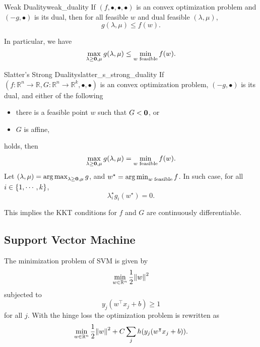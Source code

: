 \documentclass{article}
\begin{document}
\begin{proposition}{Weak Duality}{weak_duality}
    If $(f,\bullet,\bullet,\bullet)$ is an convex optimization problem and $(-g,\bullet)$ is its dual, then for all feasible $w$ and dual feasible $(\lambda,\mu)$,
    \[ g(\lambda,\mu) \le f(w). \]
\end{proposition}
In particular, we have
\[ \max_{\lambda\ge \vb{0},\mu} g(\lambda,\mu) \le \min_{w \text{ feasible}} f(w). \]

\begin{theorem}{Slatter's Strong Duality}{slatter_s_strong_duality}
    If $(f:\mathbb{R}^n\rightarrow \mathbb{R},G: \mathbb{R}^n\rightarrow \mathbb{R}^k,\bullet,\bullet)$ is an convex optimization problem, $(-g,\bullet)$ is its dual, and either of the following
    \begin{itemize}
        \item there is a feasible point $w$ such that $G < \vb{0}$, or
        \item $G$ is affine,
    \end{itemize}
    holds, then
    \[ \max_{\lambda\ge \vb{0},\mu} g(\lambda,\mu) = \min_{w \text{ feasible}} f(w). \]
    Let $(\lambda,\mu) = \operatorname*{arg\,max}_{\lambda\ge \vb{0},\mu} g$, and $w^\star = \operatorname*{arg\,min}_{w \text{ feasible}} f$.
    In such case, for all $i\in\qty{1,\cdots,k}$,
    \[ \lambda_i^\star g_i(w^\star) = 0. \]
\end{theorem}

This implies the KKT conditions for $f$ and $G$ are continuously differentiable.

\subsection{Support Vector Machine}

The minimization problem of SVM is given by
\[ \min_{w\in\mathbb{R}^n} \frac{1}{2}\norm{w}^2 \]
subjected to
\[ y_j ( w^\intercal x_j + b) \ge 1 \]
for all $j$.
With the hinge loss the optimization problem is rewritten as
\[ \min_{w\in\mathbb{R}^n} \frac{1}{2}\norm{w}^2 + C \sum_j h(y_j (w^\intercal x_j + b)). \]

% 
% 
\end{document}
